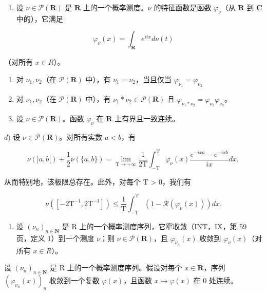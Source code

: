 \begin{enumerate}
\def\labelenumi{\arabic{enumi})}
\setcounter{enumi}{38}
\tightlist
\item
  设 \(\nu \in \mathcal{P}(\mathbf{R})\) 是 \(\mathbf{R}\) 上的一个概率测度。\(\nu\) 的特征函数是函数 \(\varphi_{\nu}\)（从 \(\mathbf{R}\) 到 \(\mathbf{C}\) 中的），它满足
\end{enumerate}

\[
\varphi_ {\nu} (x) = \int_ {\mathbf {R}} e ^ {i t x} d \nu (t)
\]

（对所有 \(x \in R\)）。

\begin{enumerate}
\def\labelenumi{\alph{enumi})}
\item
  对 \(\nu_{1},\nu_{2}\)（在 \(\mathcal{P}(\mathbf{R})\) 中），有 \(\nu_{1} = \nu_{2}\)，当且仅当 \(\varphi_{\nu_1} = \varphi_{\nu_2}\)
\item
  对 \(\nu_{1},\nu_{2}\)（在 \(\mathcal{P}(\mathbf{R})\) 中），有 \(\nu_{1}*\nu_{2}\in \mathcal{P}(\mathbf{R})\) 且 \(\varphi_{\nu_1*\nu_2} = \varphi_{\nu_1}\varphi_{\nu_2}\)。
\item
  设 \(\nu \in \mathcal{P}(\mathbf{R})\)。函数 \(\varphi_{\nu}\) 在 \(\mathbf{R}\) 上有界且一致连续。
\end{enumerate}

\(d)\) 设 \(\nu \in \mathcal{P}(\mathbf{R})\)。对所有实数 \(a < b\)，有

\[
\nu (] a, b [) + \frac {1}{2} \nu (\{a, b \}) = \lim _ {\mathrm{T} \rightarrow + \infty} \frac {1}{2 \mathrm{T}} \int_ {- \mathrm{T}} ^ {\mathrm{T}} \varphi_ {\nu} (x) \frac {e ^ {- i x a} - e ^ {- i x b}}{i x} d x,
\]

从而特别地，该极限总存在。此外，对每个 T \textgreater{} 0，我们有

\[
\nu ([ - 2 \mathrm{T} ^ {- 1}, 2 \mathrm{T} ^ {- 1} ]) \leqslant \frac {1}{\mathrm{T}} \int_ {- \mathrm{T}} ^ {\mathrm{T}} \left(1 - \mathcal {R} (\varphi_ {\nu} (x))\right) d x.
\]

\begin{enumerate}
\def\labelenumi{\alph{enumi})}
\setcounter{enumi}{4}
\tightlist
\item
  设 \((\nu_{n})_{n\in\mathbf{N}}\) 是 R 上的一个概率测度序列，它窄收敛（INT，IX，第 59 页，定义 1）到一个测度 \(\nu\)；则 \(\nu\in\mathcal{P}(\mathbf{R})\)，且 \(\varphi_{\nu_{n}}(x)\) 收敛到 \(\varphi_{\nu}(x)\)（对所有 \(x\in R\)）。
\end{enumerate}

设 \((\nu_{n})_{n\in\mathbf{N}}\) 是 R 上的一个概率测度序列。假设对每个 \(x\in\mathbf{R}\)，序列 \((\varphi_{\nu_{n}}(x))_{n}\) 收敛到一个复数 \(\varphi(x)\)，且函数 \(x\mapsto\varphi(x)\) 在 0 处连续。


